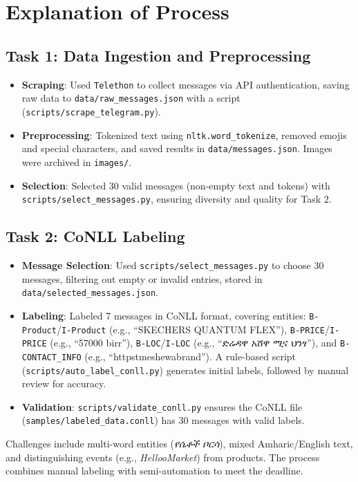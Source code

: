 \documentclass[11pt]{article}
\begin{document}
\section*{Explanation of Process}
\subsection*{Task 1: Data Ingestion and Preprocessing}
\begin{itemize}
    \item \textbf{Scraping}: Used \texttt{Telethon} to collect messages via API authentication, saving raw data to \texttt{data/raw\_messages.json} with a script (\texttt{scripts/scrape\_telegram.py}).
    \item \textbf{Preprocessing}: Tokenized text using \texttt{nltk.word\_tokenize}, removed emojis and special characters, and saved results in \texttt{data/messages.json}. Images were archived in \texttt{images/}.
    \item \textbf{Selection}: Selected 30 valid messages (non-empty text and tokens) with \texttt{scripts/select\_messages.py}, ensuring diversity and quality for Task 2.
\end{itemize}

\subsection*{Task 2: CoNLL Labeling}
\begin{itemize}
    \item \textbf{Message Selection}: Used \texttt{scripts/select\_messages.py} to choose 30 messages, filtering out empty or invalid entries, stored in \texttt{data/selected\_messages.json}.
    \item \textbf{Labeling}: Labeled 7 messages in CoNLL format, covering entities: \texttt{B-Product}/\texttt{I-Product} (e.g., ``SKECHERS QUANTUM FLEX''), \texttt{B-PRICE}/\texttt{I-PRICE} (e.g., ``57000 birr''), \texttt{B-LOC}/\texttt{I-LOC} (e.g., ``ድሬዳዋ አሸዋ ሚና ህንፃ''), and \texttt{B-CONTACT\_INFO} (e.g., ``httpstmeshewabrand''). A rule-based script (\texttt{scripts/auto\_label\_conll.py}) generates initial labels, followed by manual review for accuracy.
    \item \textbf{Validation}: \texttt{scripts/validate\_conll.py} ensures the CoNLL file (\texttt{samples/labeled\_data.conll}) has 30 messages with valid labels.
\end{itemize}
Challenges include multi-word entities (\textit{የሴቶች ቦርሳ}), mixed Amharic/English text, and distinguishing events (e.g., \textit{HellooMarket}) from products. The process combines manual labeling with semi-automation to meet the deadline.
\end{document}
